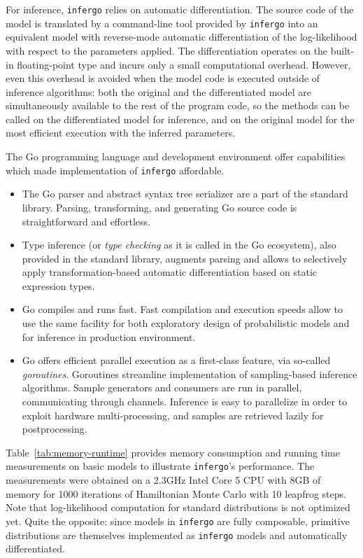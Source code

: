 \documentclass[sigplan,review]{acmart}\settopmatter{printfolios=true,printccs=false,printacmref=false}
\begin{document}
\begin{sloppypar}
For inference, \texttt{infergo} relies on automatic
differentiation. The source code of the model is
translated by a command-line tool provided by \texttt{infergo}
into an equivalent model with reverse-mode automatic
differentiation of the log-likelihood with respect 
to the parameters applied. The differentiation operates
on the built-in floating-point type and incurs only a small
computational overhead. However, even this overhead is avoided
when the model code is executed outside of inference algorithms:
both the original and the differentiated model are
simultaneously available to the rest of the program code, so
the methods can be called on the differentiated model for
inference, and on the original model for the most efficient
execution with the inferred parameters.

The Go programming language and development environment offer
capabilities which made implementation of \texttt{infergo}
affordable.

\begin{itemize}
    \item The Go parser and abstract syntax tree serializer are
        a part of the standard library. Parsing, transforming,
        and generating Go source code is straightforward and
        effortless.
	\item Type inference (or \textit{type checking} as it is
		called in the Go ecosystem), also provided in the
		standard library, augments parsing and allows to
		selectively apply transformation-based automatic
		differentiation  based on static expression types. 
	\item Go compiles and runs fast. Fast compilation and
		execution speeds allow to use the same facility for both
		exploratory design of probabilistic models and for
		inference in production environment.
	\item Go offers efficient parallel execution as a
		first-class feature, via so-called \textit{goroutines}.
		Goroutines streamline implementation of sampling-based
		inference algorithms. Sample generators and consumers
		are run in parallel, communicating through channels. 
		Inference is easy to parallelize in order to exploit
		hardware multi-processing, and samples are retrieved
		lazily for postprocessing. 
\end{itemize}

Table~\ref{tab:memory-runtime} provides memory consumption and
running time measurements on basic models to
illustrate  \texttt{infergo}'s performance.
The measurements were obtained on a 2.3GHz Intel Core 5
CPU with 8GB of memory for 1000 iterations of Hamiltonian Monte
Carlo with 10 leapfrog steps. Note that log-likelihood computation 
for standard distributions is not optimized yet. Quite the
opposite: since models in \texttt{infergo} are fully composable,
primitive distributions are themselves implemented as
\texttt{infergo} models and automatically differentiated.


\end{sloppypar}
\end{document}
